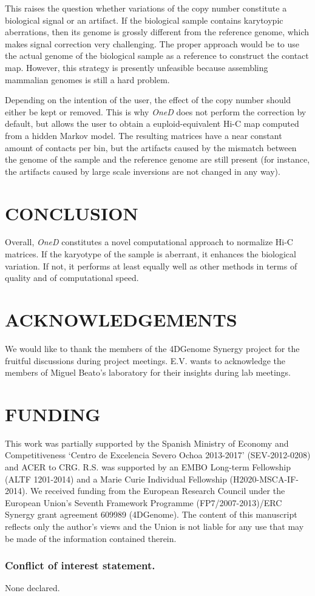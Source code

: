 \documentclass[a4,center,fleqn]{NAR}
\begin{document}
This raises the question whether variations of the copy number constitute
a biological signal or an artifact. If the biological sample contains
karytoypic aberrations, then its genome is grossly different from the
reference genome, which makes signal correction very challenging. The
proper approach would be to use the actual genome of the biological sample
as a reference to construct the contact map. However, this strategy is
presently unfeasible because assembling mammalian genomes is still a hard
problem.

Depending on the intention of the user, the effect of the copy number
should either be kept or removed. This is why \textit{OneD} does not
perform the correction by default, but allows the user to obtain a
euploid-equivalent Hi-C map computed from a hidden Markov model. The
resulting matrices have a near constant amount of contacts per bin, but
the artifacts caused by the mismatch between the genome of the sample and
the reference genome are still present (for instance, the artifacts caused
by large scale inversions are not changed in any way).


\section{CONCLUSION}

Overall, \textit{OneD} constitutes a novel computational approach to
normalize Hi-C matrices. If the karyotype of the sample is aberrant, it
enhances the biological variation.  If not, it performs at least equally
well as other methods in terms of quality and of computational speed.


\section{ACKNOWLEDGEMENTS}

We would like to thank the members of the 4DGenome Synergy project for the
fruitful discussions during project meetings. E.V. wants to acknowledge
the members of Miguel Beato's laboratory for their insights during lab
meetings.


\section{FUNDING}

This work was partially supported by the Spanish Ministry of Economy and
Competitiveness `Centro de Excelencia Severo Ochoa 2013-2017'
(SEV-2012-0208) and ACER to CRG. R.S. was supported by an EMBO Long-term
Fellowship (ALTF 1201-2014) and a Marie Curie Individual Fellowship
(H2020-MSCA-IF-2014). We received funding from the European Research
Council under the European Union's Seventh Framework Programme
(FP7/2007-2013)/ERC Synergy grant agreement 609989 (4DGenome). The content
of this manuscript reflects only the author's views and the Union is not
liable for any use that may be made of the information contained therein.

\subsubsection{Conflict of interest statement.} None declared.
\newpage



\end{document}
